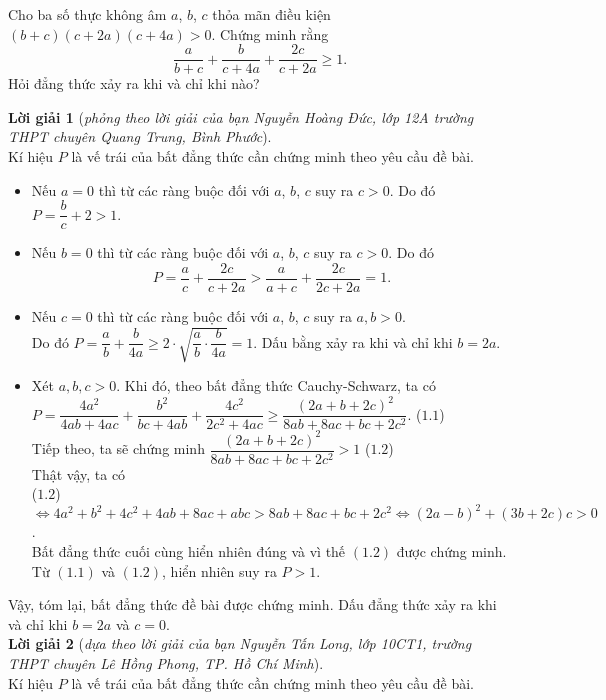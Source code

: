 \begin{bt}%
	Cho ba số thực không âm $a$, $b$, $c$ thỏa mãn điều kiện $(b+c)(c+2a)(c+4a)>0$. Chứng minh rằng $$ \dfrac{a}{b+c} + \dfrac{b}{c + 4a} + \dfrac{2c}{c+2a} \ge 1.$$ Hỏi đẳng thức xảy ra khi và chỉ khi nào?
	\loigiai
	{
		{\bf Lời giải 1} (\textit{phỏng theo lời giải của bạn Nguyễn Hoàng Đức, lớp 12A trường THPT chuyên Quang Trung, Bình Phước}).\\
		Kí hiệu $P$ là vế trái của bất đẳng thức cần chứng minh theo yêu cầu đề bài.
	\begin{itemize}
		\item  Nếu $a=0$ thì từ các ràng buộc đối với $a$, $b$, $c$ suy ra $c>0$. Do đó 
		$P  = \dfrac{b}{c} + 2 > 1.$
		\item  Nếu $b=0$ thì từ các ràng buộc đối với $a$, $b$, $c$ suy ra $c>0$. 
		Do đó $$P = \dfrac{a}{c} + \dfrac{2c}{c+2a} > \dfrac{a}{a+c} + \dfrac{2c}{2c+2a} = 1.$$
		\item  Nếu $c=0$ thì từ các ràng buộc đối với $a$, $b$, $c$ suy ra $a,b>0$. \\
		Do đó $P = \dfrac{a}{b} + \dfrac{b}{4a} \ge 2 \cdot \sqrt{\dfrac{a}{b} \cdot \dfrac{b}{4a}} = 1.$ Dấu bằng xảy ra khi và chỉ khi $b=2a$.
		\item  Xét $a,b,c>0$. Khi đó, theo bất đẳng thức Cauchy-Schwarz, ta có\\
		$P = \dfrac{4a^2}{4ab+4ac} + \dfrac{b^2}{bc + 4ab} + \dfrac{4c^2}{2c^2 + 4ac} \ge \dfrac{(2a+b+2c)^2}{8ab + 8ac + bc + 2c^2}.$ \hfill ($1.1$)\\
		Tiếp theo, ta sẽ chứng minh $\dfrac{(2a+b+2c)^2}{8ab + 8ac +bc +2c^2}>1$ \hfill ($1.2$)\\
		Thật vậy, ta có\\
		($1.2$) $\Leftrightarrow 4a^2 + b^2 + 4c^2 + 4ab + 8ac + abc > 8ab + 8ac + bc + 2c^2 \Leftrightarrow (2a-b)^2 + (3b+2c)c > 0$.\\
		Bất đẳng thức cuối cùng hiển nhiên đúng và vì thế $(1.2)$ được chứng minh. \\
		Từ $(1.1)$ và $(1.2)$, hiển nhiên suy ra $P > 1$.
	\end{itemize}
Vậy, tóm lại, bất đẳng thức đề bài được chứng minh.
		Dấu đẳng thức xảy ra khi và chỉ khi $b = 2a$ và $c=0$.\\
		{\bf Lời giải 2} (\textit{dựa theo lời giải của bạn Nguyễn Tấn Long, lớp 10CT1, trường THPT chuyên Lê Hồng Phong, TP. Hồ Chí Minh}).\\
		Kí hiệu $P$ là vế trái của bất đẳng thức cần chứng minh theo yêu cầu đề bài.\\
}
\end{bt}
